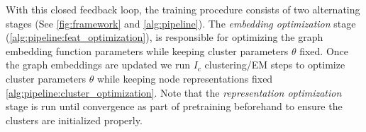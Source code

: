 With this closed feedback loop, the training procedure consists of two alternating stages (See \cref{fig:framework} and \cref{alg:pipeline}).
The \textit{embedding optimization} stage (\cref{alg:pipeline:feat_optimization}), is responsible for optimizing the graph embedding function parameters while keeping cluster parameters $\theta$ fixed.
Once the graph embeddings are updated we run $I_c$ clustering/EM steps to optimize cluster parameters $\theta$ while keeping node representations fixed \cref{alg:pipeline:cluster_optimization}. Note that the \textit{representation optimization} stage is run until convergence as part of pretraining beforehand to ensure the clusters are initialized properly.


